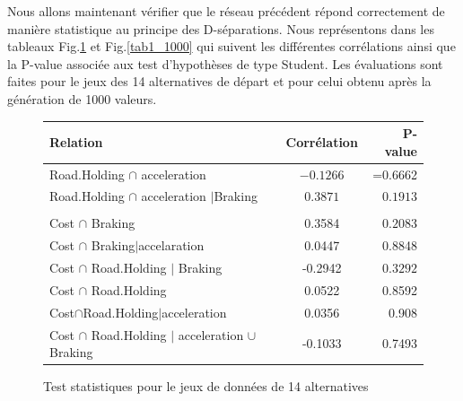 \documentclass[a4paper]{article}
\begin{document}
Nous allons maintenant vérifier que le réseau précédent répond correctement de manière statistique au principe des D-séparations.
Nous représentons dans les tableaux Fig.\ref{tab1_14} et Fig.\ref{tab1_1000} qui suivent les différentes corrélations ainsi que la P-value associée aux test d'hypothèses de type Student. 
Les évaluations sont faites pour le jeux des 14 alternatives de départ  et pour celui obtenu après la génération de 1000 valeurs.

\begin{figure}[H]
\begin{center}
\begin{tabular}{|l|c|r|}
  \hline
  Relation & Corrélation & P-value \\
  \hline
   Road.Holding $\cap$  acceleration&$-0.1266$& =0.6662 \\
   Road.Holding $\cap$  acceleration $|$Braking &$0.3871$& $0.1913$  \\
\hline \hline \\
Cost $\cap$ Braking &0.3584&$0.2083$\\
Cost $\cap$ Braking$|$accelaration &0.0447&0.8848\\
\hline \hline 
Cost $\cap$ Road.Holding $|$ Braking&-0.2942&$ 0.3292$\\
Cost $\cap$ Road.Holding &0.0522&0.8592\\
Cost$\cap$Road.Holding$|$acceleration&0.0356&0.908\\
Cost $\cap$ Road.Holding $|$ acceleration $\cup$ Braking&-0.1033&0.7493\\
\hline
\end{tabular}
\end{center}
\caption{Test statistiques pour le jeux de données de 14 alternatives }
\label{tab1_14}
\end{figure}
\end{document}
